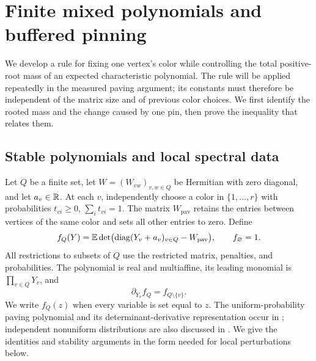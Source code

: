 \section{Finite mixed polynomials and buffered pinning}\label{poly:section}

We develop a rule for fixing one vertex's color while controlling the
total positive-root mass of an expected characteristic polynomial.
The rule will be applied repeatedly in the measured paving argument;
its constants must therefore be independent of the matrix size and
of previous color choices. We first identify the rooted mass and the
change caused by one pin, then prove the inequality that relates them.

\subsection{Stable polynomials and local spectral data}

Let $Q$ be a finite set, let $W=(W_{vw})_{v,w\in Q}$ be Hermitian
with zero diagonal, and let $a_v\in\mathbb R$. At each $v$, independently choose
a color in $\{1,\ldots,r\}$ with probabilities $t_{vi}\geq0$,
$\sum_i t_{vi}=1$. The matrix $W_{\mathrm{pav}}$ retains the entries between
vertices of the same color and sets all other entries to zero. Define
\begin{equation}\label{poly:definition}
 f_Q(Y)=\mathbb E\det\bigl(\operatorname{diag}(Y_v+a_v)_{v\in Q}-W_{\mathrm{pav}}\bigr),
 \qquad f_\varnothing=1.
\end{equation}
All restrictions to subsets of $Q$ use the restricted matrix, penalties,
and probabilities. The polynomial is real and multiaffine, its leading
monomial is $\prod_{v\in Q}Y_v$, and
\begin{equation}\label{poly:deletion}
 \partial_{Y_v}f_Q=f_{Q\setminus\{v\}}.
\end{equation}
We write $f_Q(z)$ when every variable is set equal to $z$.
The uniform-probability paving polynomial and its determinant-derivative
representation occur in \cite[Theorem~1.6 and Proposition~1.7]{RL20};
independent nonuniform distributions are also discussed in
\cite[remark following Lemma~24]{RS21}. We give the identities and
stability arguments in the form needed for local perturbations below.

